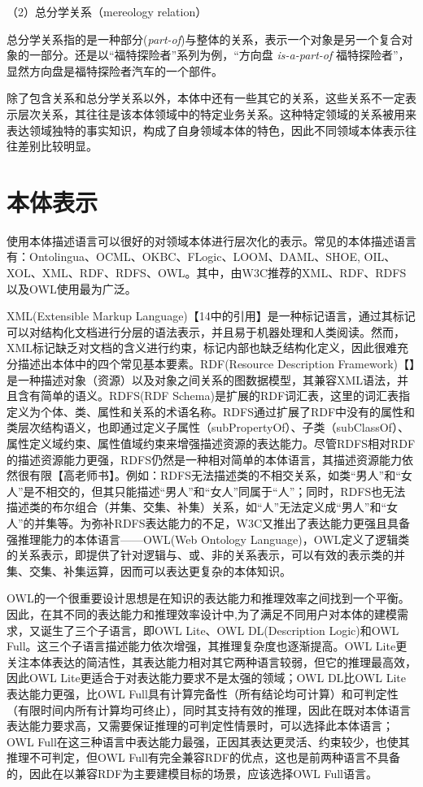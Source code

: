 （2）总分学关系（mereology relation）

总分学关系指的是一种部分(\textit{part-of})与整体的关系，表示一个对象是另一个复合对象的一部分。还是以“福特探险者”系列为例，“方向盘 \textit{is-a-part-of} 福特探险者”，显然方向盘是福特探险者汽车的一个部件。

除了包含关系和总分学关系以外，本体中还有一些其它的关系，这些关系不一定表示层次关系，其往往是该本体领域中的特定业务关系。这种特定领域的关系被用来表达领域独特的事实知识，构成了自身领域本体的特色，因此不同领域本体表示往往差别比较明显。

\section{本体表示}
使用本体描述语言可以很好的对领域本体进行层次化的表示。常见的本体描述语言有：Ontolingua、OCML、OKBC、FLogic、LOOM、DAML、SHOE, OIL、XOL、XML、RDF、RDFS、OWL\cite{Corcho}。其中，由W3C推荐的XML、RDF、RDFS以及OWL使用最为广泛。

XML(Extensible Markup Language)\cite{xml}【14中的引用】是一种标记语言，通过其标记可以对结构化文档进行分层的语法表示，并且易于机器处理和人类阅读。然而，XML标记缺乏对文档的含义进行约束，标记内部也缺乏结构化定义，因此很难充分描述出本体中的四个常见基本要素。RDF(Resource Description Framework)\cite{rdf}【】是一种描述对象（资源）以及对象之间关系的图数据模型，其兼容XML语法，并且含有简单的语义。RDFS(RDF Schema)\cite{rdfs}是扩展的RDF词汇表，这里的词汇表指定义为个体、类、属性和关系的术语名称。RDFS通过扩展了RDF中没有的属性和类层次结构语义，也即通过定义子属性（subPropertyOf）、子类（subClassOf）、属性定义域约束、属性值域约束来增强描述资源的表达能力。尽管RDFS相对RDF的描述资源能力更强，RDFS仍然是一种相对简单的本体语言，其描述资源能力依然很有限\cite{gao}【高老师书】。例如：RDFS无法描述类的不相交关系，如类“男人”和“女人”是不相交的，但其只能描述“男人”和“女人”同属于“人”；同时，RDFS也无法描述类的布尔组合（并集、交集、补集）关系，如“人”无法定义成“男人”和“女人”的并集等。为弥补RDFS表达能力的不足，W3C又推出了表达能力更强且具备强推理能力的本体语言——OWL(Web Ontology Language)\cite{owl}，OWL定义了逻辑类的关系表示，即提供了针对逻辑与、或、非的关系表示，可以有效的表示类的并集、交集、补集运算，因而可以表达更复杂的本体知识。

OWL的一个很重要设计思想是在知识的表达能力和推理效率之间找到一个平衡。因此，在其不同的表达能力和推理效率设计中,为了满足不同用户对本体的建模需求，又诞生了三个子语言，即OWL Lite、OWL DL(Description Logic)和OWL Full。这三个子语言描述能力依次增强，其推理复杂度也逐渐提高。OWL Lite更关注本体表达的简洁性，其表达能力相对其它两种语言较弱，但它的推理最高效，因此OWL Lite更适合于对表达能力要求不是太强的领域；OWL DL比OWL Lite表达能力更强，比OWL Full具有计算完备性（所有结论均可计算）和可判定性（有限时间内所有计算均可终止），同时其支持有效的推理，因此在既对本体语言表达能力要求高，又需要保证推理的可判定性情景时，可以选择此本体语言；OWL Full在这三种语言中表达能力最强，正因其表达更灵活、约束较少，也使其推理不可判定，但OWL Full有完全兼容RDF的优点，这也是前两种语言不具备的，因此在以兼容RDF为主要建模目标的场景，应该选择OWL Full语言。


